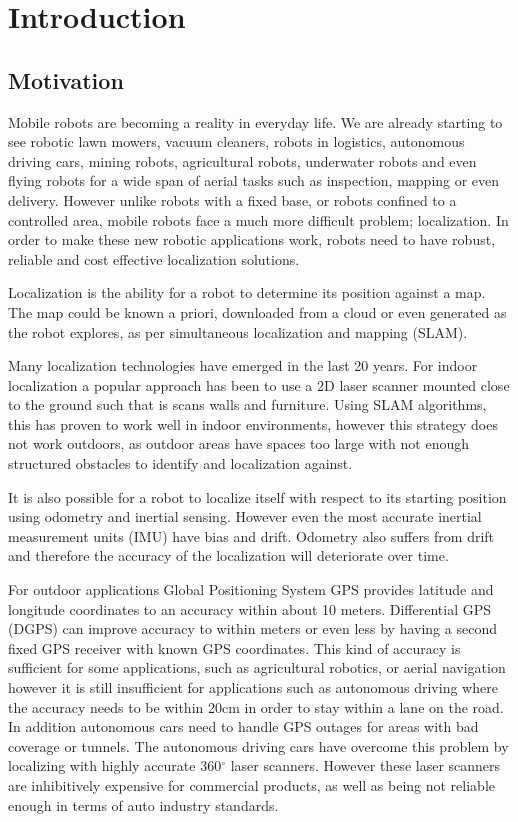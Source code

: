 \chapter{Introduction}
\label{chapter:Introduction}


\section{Motivation}
Mobile robots are becoming a reality in everyday life.  We are already starting to see robotic lawn mowers, vacuum cleaners, robots in logistics, autonomous driving cars, mining robots, agricultural robots, underwater robots and even flying robots for a wide span of aerial tasks such as inspection, mapping or even delivery.  However unlike robots with a fixed base, or robots confined to a controlled area, mobile robots face a much more difficult problem; localization.  In order to make these new robotic applications work, robots need to have robust, reliable and cost effective localization solutions.

Localization is the ability for a robot to determine its position against a map.  The map could be known a priori, downloaded from a cloud or even generated as the robot explores, as per simultaneous localization and mapping (SLAM).  

Many localization technologies have emerged in the last 20 years.  For indoor localization a popular approach has been to use a 2D laser scanner mounted close to the ground such that is scans walls and furniture.  Using SLAM algorithms, this has proven to work well in indoor environments, however this strategy does not work outdoors, as outdoor areas have spaces too large with not enough structured obstacles to identify and localization against.

It is also possible for a robot to localize itself with respect to its starting position using odometry and inertial sensing.  However even the most accurate inertial measurement units (IMU) have bias and drift.  Odometry also suffers from drift and therefore the accuracy of the localization will deteriorate over time.

For outdoor applications Global Positioning System GPS provides latitude and longitude coordinates to an accuracy within about 10 meters.  Differential GPS (DGPS) can improve accuracy to within meters or even less by having a second fixed GPS receiver with known GPS coordinates.  This kind of accuracy is sufficient for some applications, such as agricultural robotics, or aerial navigation however it is still insufficient for applications such as autonomous driving where the accuracy needs to be within 20cm in order to stay within a lane on the road.  In addition autonomous cars need to handle GPS outages for areas with bad coverage or tunnels.  The autonomous driving cars have overcome this problem by localizing with highly accurate 360$^{\circ}$ laser scanners.  However these laser scanners are inhibitively expensive for commercial products, as well as being not reliable enough in terms of auto industry standards.

